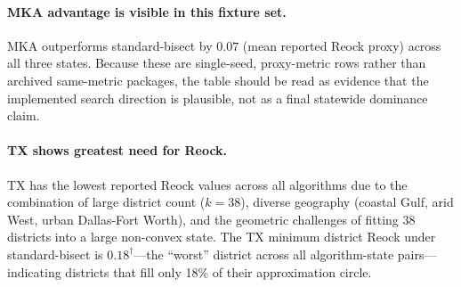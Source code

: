 \paragraph{MKA advantage is visible in this fixture set.}
MKA outperforms standard-bisect by $0.07$ (mean reported Reock proxy) across all
three states.  Because these are single-seed, proxy-metric rows rather than
archived same-metric packages, the table should be read as evidence that the
implemented search direction is plausible, not as a final statewide dominance
claim.

\paragraph{TX shows greatest need for Reock.}
TX has the lowest reported Reock values across all algorithms due to the combination of
large district count ($k=38$), diverse geography (coastal Gulf, arid West, urban
Dallas-Fort Worth), and the geometric challenges of fitting 38 districts into
a large non-convex state.
The TX minimum district Reock under standard-bisect is $0.18^\dagger$---the
``worst'' district across all algorithm-state pairs---indicating districts that
fill only 18\% of their approximation circle.
